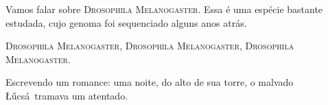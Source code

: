 \documentclass[12pt]{memoir}
\newcommand{\DrosophilaMelanogaster}{\textsc{Drosophila Melanogaster}}
\newcommand{\vilao}{\L\H ucsá}
\begin{document}
Vamos falar sobre \DrosophilaMelanogaster.
Essa é uma espécie bastante estudada, cujo genoma foi sequenciado alguns anos atrás.

\DrosophilaMelanogaster,
\DrosophilaMelanogaster,
\DrosophilaMelanogaster.

Escrevendo um romance: uma noite, do alto de sua torre, o malvado \vilao\ tramava um atentado. 
\end{document}
